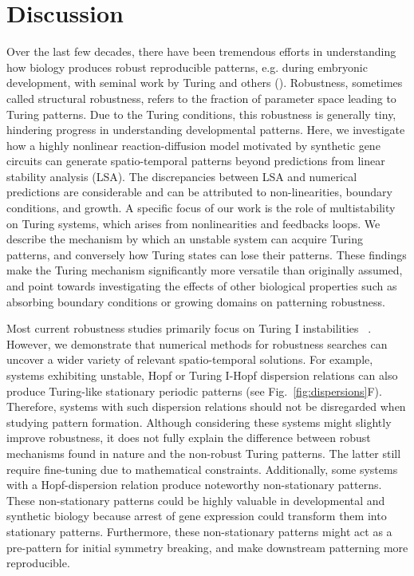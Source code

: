 \section{Discussion}

Over the last few decades, there have been tremendous efforts in understanding how biology produces robust reproducible patterns, e.g. during embryonic development, with seminal work by Turing and others (\cite{Turing1952,Gierer1972, maini2012turing}). Robustness, sometimes called structural robustness, refers to the fraction of parameter space leading to Turing patterns. Due to the Turing conditions, this robustness is generally tiny, hindering progress in understanding developmental patterns. Here, we investigate how a highly nonlinear reaction-diffusion model motivated by synthetic gene circuits can generate spatio-temporal patterns beyond predictions from linear stability analysis (LSA). The discrepancies between LSA and numerical predictions are considerable and can be attributed to non-linearities, boundary conditions, and growth. A specific focus of our work is the role of multistability on Turing systems, which arises from nonlinearities and feedbacks loops. We describe the mechanism by which an unstable system can acquire Turing patterns, and conversely how Turing states can lose their patterns. These findings make the Turing mechanism significantly more versatile than originally assumed, and point towards investigating the effects of other biological properties such as absorbing boundary conditions or growing domains on patterning robustness. 

Most current robustness studies primarily focus on Turing I instabilities ~\parencite{Scholes2019, Zheng2016, Marcon}.
However, we demonstrate that numerical methods for robustness searches can uncover a wider variety of relevant spatio-temporal solutions.
For example, systems exhibiting unstable, Hopf or Turing I-Hopf dispersion relations can also produce Turing-like stationary periodic patterns (see Fig.~\ref{fig:dispersions}F). Therefore, systems with such dispersion relations should not be disregarded when studying pattern formation.
Although considering these systems might slightly improve robustness, it does not fully explain the difference between robust mechanisms found in nature and the non-robust Turing patterns. The latter still require fine-tuning due to mathematical constraints.
Additionally, some systems with a Hopf-dispersion relation produce noteworthy non-stationary patterns.
These non-stationary patterns could be highly valuable in developmental and synthetic biology because arrest of gene expression could transform them into stationary patterns.
Furthermore, these non-stationary patterns might act as a pre-pattern for initial symmetry breaking, and make downstream patterning more reproducible. 

